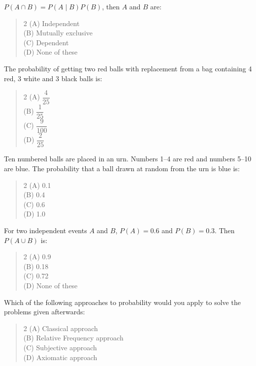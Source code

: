 \documentclass[11pt,a4paper]{article}
\begin{document}
\begin{mcqlist}
\item $P(A\cap B)=P(A\mid B)P(B)$, then $A$ and $B$ are:
\begin{quote}\begin{multicols}{2}
\noindent (A) Independent \\
(B) Mutually exclusive \\
(C) Dependent \\
(D) None of these
\end{multicols}\end{quote}

\item The probability of getting two red balls with replacement from a bag containing 4 red, 3 white and 3 black balls is:
\begin{quote}\begin{multicols}{2}
\noindent (A) $\dfrac{4}{25}$ \\
(B) $\dfrac{1}{25}$ \\
(C) $\dfrac{9}{100}$ \\
(D) $\dfrac{2}{25}$
\end{multicols}\end{quote}

\item Ten numbered balls are placed in an urn. Numbers 1--4 are red and numbers 5--10 are blue. The probability that a ball drawn at random from the urn is blue is:
\begin{quote}\begin{multicols}{2}
\noindent (A) 0.1 \\
(B) 0.4 \\
(C) 0.6 \\
(D) 1.0
\end{multicols}\end{quote}

\item For two independent events $A$ and $B$, $P(A)=0.6$ and $P(B)=0.3$. Then $P(A\cup B)$ is:
\begin{quote}\begin{multicols}{2}
\noindent (A) 0.9 \\
(B) 0.18 \\
(C) 0.72 \\
(D) None of these
\end{multicols}\end{quote}

\item Which of the following approaches to probability would you apply to solve the problems given afterwards:
\begin{quote}\begin{multicols}{2}
\noindent (A) Classical approach \\
(B) Relative Frequency approach \\
(C) Subjective approach \\
(D) Axiomatic approach
\end{multicols}\end{quote}


\end{mcqlist}
\end{document}
